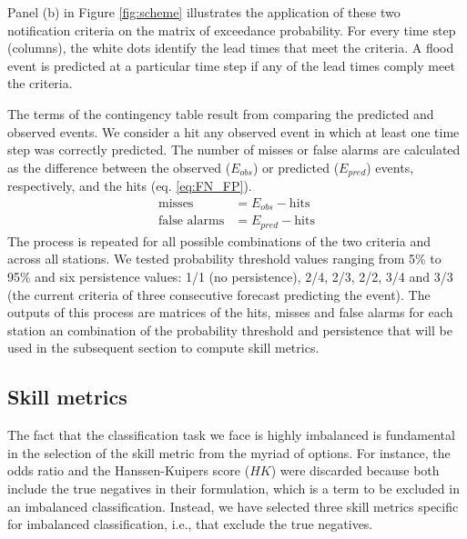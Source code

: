 \documentclass[preprint,12pt,authoryear]{elsarticle}
\begin{document}
Panel (b) in Figure \ref{fig:scheme} illustrates the application of these two notification criteria on the matrix of exceedance probability. For every time step (columns), the white dots identify the lead times that meet the criteria. A flood event is predicted at a particular time step if any of the lead times comply meet the criteria.

The terms of the contingency table result from comparing the predicted and observed events. We consider a hit any observed event in which at least one time step was correctly predicted. The number of misses or false alarms are calculated as the difference between the observed ($E_{obs}$) or predicted ($E_{pred}$) events, respectively, and the hits (eq. \ref{eq:FN_FP}).
\begin{align}
    \label{eq:FN_FP}
    \text{misses} & = E_{obs} - \text{hits} \\
    \text{false alarms} & = E_{pred} - \text{hits}
\end{align}
The process is repeated for all possible combinations of the two criteria and across all stations. We tested probability threshold values ranging from 5\% to 95\% and six persistence values: 1/1 (no persistence), 2/4, 2/3, 2/2, 3/4 and 3/3 (the current criteria of three consecutive forecast predicting the event). The outputs of this process are matrices of the hits, misses and false alarms for each station an combination of the probability threshold and persistence that will be used in the subsequent section to compute skill metrics.

\subsection{Skill metrics}
\label{sec:methods_metrics}

The fact that the classification task we face is highly imbalanced is fundamental in the selection of the skill metric from the myriad of options. For instance, the odds ratio and the Hanssen-Kuipers score ($HK$) \cite{Hanssen1965} were discarded because both include the true negatives in their formulation, which is a term to be excluded in an imbalanced classification. Instead, we have selected three skill metrics specific for imbalanced classification, i.e., that exclude the true negatives. 
\end{document}
